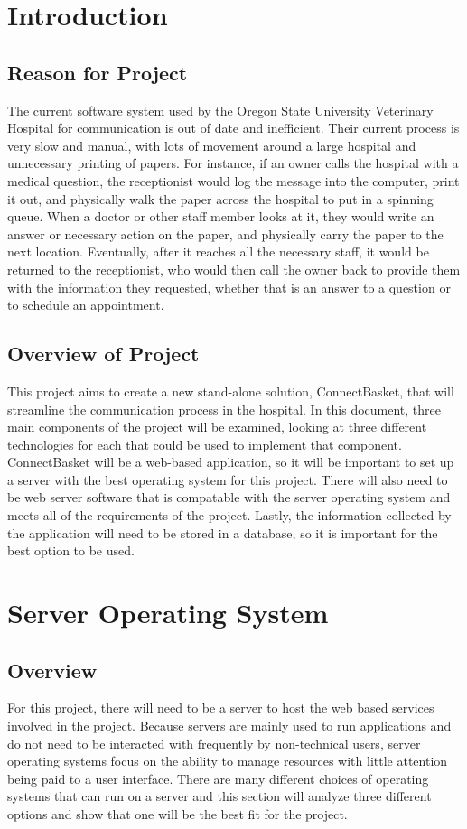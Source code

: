 \documentclass[onecolumn, draftclsnofoot,10pt, compsoc]{IEEEtran}
\begin{document}
\section{Introduction}

\subsection{Reason for Project}
The current software system used by the Oregon State University Veterinary Hospital for communication is out of date and inefficient. Their current process is very slow and manual, with lots of movement around a large hospital and unnecessary printing of papers. For instance, if an owner calls the hospital with a medical question, the receptionist would log the message into the computer, print it out, and physically walk the paper across the hospital to put in a spinning queue. When a doctor or other staff member looks at it, they would write an answer or necessary action on the paper, and physically carry the paper to the next location. Eventually, after it reaches all the necessary staff, it would be returned to the receptionist, who would then call the owner back to provide them with the information they requested, whether that is an answer to a question or to schedule an appointment. 

\subsection{Overview of Project}
This project aims to create a new stand-alone solution, ConnectBasket, that will streamline the communication process in the hospital. In this document, three main components of the project will be examined, looking at three different technologies for each that could be used to implement that component. ConnectBasket will be a web-based application, so it will be important to set up a server with the best operating system for this project. There will also need to be web server software that is compatable with the server operating system and meets all of the requirements of the project. Lastly, the information collected by the application will need to be stored in a database, so it is important for the best option to be used.

\section{Server Operating System}

\subsection{Overview}
For this project, there will need to be a server to host the web based services involved in the project. Because servers are mainly used to run applications and do not need to be interacted with frequently by non-technical users, server operating systems focus on the ability to manage resources with little attention being paid to a user interface. There are many different choices of operating systems that can run on a server and this section will analyze three different options and show that one will be the best fit for the project.
\end{document}
